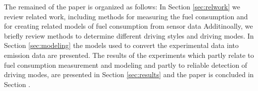 The remained of the paper is organized as follows:
In Section \ref{sec:relwork} we review related work, including methods for measuring the fuel consumption and for creating related models of fuel consumption from sensor data  Additinoally, we briefly review methods to determine different driving styles and driving modes.
In Section \ref{sec:modeling} the models used to convert the experimental data into emission data are presented. 
The results of the experiments which partly relate to fuel consumption measurement and modeling and partly to reliable detection of driving modes, are presented in Section \ref{sec:results} and the paper is concluded in Section \label{sec:conclusions}.
